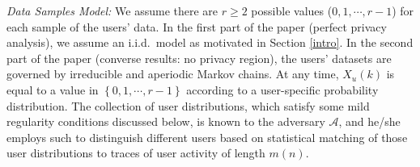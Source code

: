 \textit{Data Samples Model:}
We assume there are $r \geq 2$ possible values ($0,1, \cdots, r-1$) for each sample of the users' data. In the first part of the paper (perfect privacy analysis), we assume an i.i.d.\ model as motivated in Section \ref{intro}. In the second part of the paper (converse results: no privacy region), the users' datasets are governed by irreducible and aperiodic Markov chains. At any time, $X_u(k)$ is equal to a value in $\left\{0,1, \cdots, r-1 \right\}$ according to a user-specific probability distribution. The collection of user distributions, which satisfy some mild regularity conditions discussed below, is known to the adversary $\mathcal{A}$, and he/she employs such to distinguish different users based on statistical matching of those user distributions to traces of user activity of length $m(n)$.%





